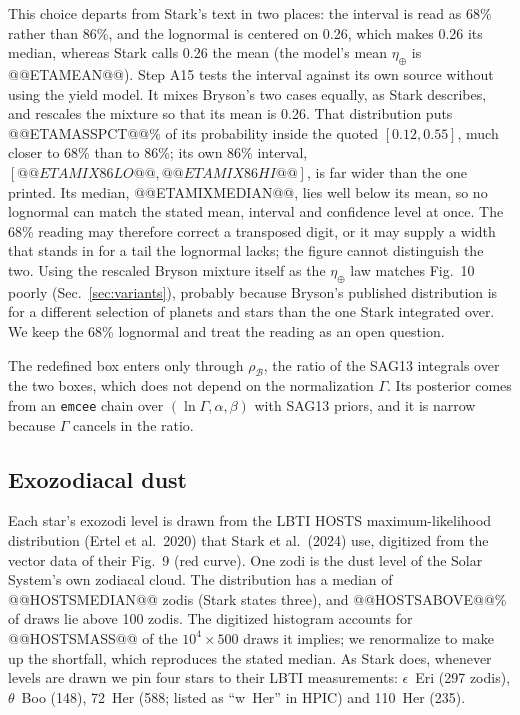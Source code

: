 \documentclass[11pt,a4paper]{article}
\begin{document}
This choice departs from Stark's text in two places: the interval is read as 68\% rather than
86\%, and the lognormal is centered on 0.26, which makes 0.26 its median, whereas Stark calls 0.26
the mean (the model's mean $\eta_\oplus$ is @@ETAMEAN@@). Step A15 tests the interval against its
own source without using the yield model. It mixes Bryson's two cases equally, as Stark describes,
and rescales the mixture so that its mean is 0.26. That distribution puts @@ETAMASSPCT@@\% of its
probability inside the quoted $[0.12, 0.55]$, much closer to 68\% than to 86\%; its own 86\%
interval, $[@@ETAMIX86LO@@, @@ETAMIX86HI@@]$, is far wider than the one printed. Its median,
@@ETAMIXMEDIAN@@, lies well below its mean, so no lognormal can match the stated mean, interval and
confidence level at once. The 68\% reading may therefore correct a transposed digit, or it may
supply a width that stands in for a tail the lognormal lacks; the figure cannot distinguish the
two. Using the rescaled Bryson mixture itself as the $\eta_\oplus$ law matches Fig.~10 poorly
(Sec.~\ref{sec:variants}), probably because Bryson's published distribution is for a different
selection of planets and stars than the one Stark integrated over. We keep the 68\% lognormal and
treat the reading as an open question.

The redefined box enters only through $\rho_\mathcal{B}$, the ratio of the SAG13 integrals over
the two boxes, which does not depend on the normalization $\Gamma$. Its posterior comes from an
\texttt{emcee} chain over $(\ln\Gamma, \alpha, \beta)$ with SAG13 priors, and it is narrow because
$\Gamma$ cancels in the ratio.

\subsection{Exozodiacal dust}
\label{sec:exozodi}

Each star's exozodi level is drawn from the LBTI HOSTS maximum-likelihood distribution (Ertel et
al.\ 2020) that Stark et al.\ (2024) use, digitized from the vector data of their Fig.~9 (red
curve). One zodi is the dust level of the Solar System's own zodiacal cloud. The distribution has a
median of @@HOSTSMEDIAN@@ zodis (Stark states three), and @@HOSTSABOVE@@\% of draws lie above 100
zodis. The digitized histogram accounts for @@HOSTSMASS@@ of the $10^4 \times 500$ draws it
implies; we renormalize to make up the shortfall, which reproduces the stated median. As Stark
does, whenever levels are drawn we pin four stars to their LBTI measurements: $\epsilon$~Eri (297
zodis), $\theta$~Boo (148), 72~Her (588; listed as ``w~Her'' in HPIC) and 110~Her (235).
\end{document}
